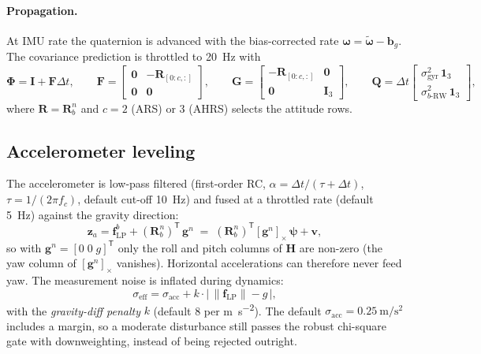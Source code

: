 \documentclass[11pt,a4paper]{article}
\newcommand{\vect}[1]{\bm{#1}}
\newcommand{\mat}[1]{\bm{#1}}
\newcommand{\T}{^{\mathsf{T}}}
\newcommand{\cross}[1]{\left[#1\right]_{\times}}   %
\newcommand{\nframe}{n}
\newcommand{\bframe}{b}
\newcommand{\Rbn}{\mat{R}_{\bframe}^{\nframe}}
\newcommand{\dt}{\Delta t}
\begin{document}
\paragraph{Propagation.} At IMU rate the quaternion is advanced with the
bias-corrected rate $\vect{\omega} = \tilde{\vect{\omega}} -
\vect{b}_g$. The covariance prediction is throttled to \SI{20}{\hertz}
with \cite[eq.~10.9]{wendel2011}
\begin{equation}
  \mat{\Phi} = \mat{I} + \mat{F}\dt, \qquad
  \mat{F} =
  \begin{bmatrix}
    \mat{0} & -\mat{R}_{[0:c,:]} \\
    \mat{0} & \mat{0}
  \end{bmatrix},
  \qquad
  \mat{G} =
  \begin{bmatrix}
    -\mat{R}_{[0:c,:]} & \mat{0} \\
    \mat{0} & \mat{I}_3
  \end{bmatrix},
  \qquad
  \vect{Q} = \dt
  \begin{bmatrix}
    \sigma^2_{\text{gyr}}\,\vect{1}_3 \\
    \sigma^2_{b\text{-RW}}\,\vect{1}_3
  \end{bmatrix},
\end{equation}
where $\mat{R} = \Rbn$ and $c = 2$ (ARS) or $3$ (AHRS) selects the
attitude rows.

\subsection{Accelerometer leveling}

The accelerometer is low-pass filtered (first-order RC,
$\alpha = \dt/(\tau + \dt)$, $\tau = 1/(2\pi f_c)$, default cut-off
\SI{10}{\hertz}) and fused at a throttled rate (default \SI{5}{\hertz})
against the gravity direction:
\begin{equation}
  \vect{z}_a = \vect{f}^\bframe_{\text{LP}}
             + (\Rbn)\T\,\vect{g}^\nframe
  \;=\; (\Rbn)\T \cross{\vect{g}^\nframe}\,\vect{\psi} + \vect{v},
\end{equation}
so with $\vect{g}^\nframe = [0\;0\;g]\T$ only the roll and pitch
columns of $\mat{H}$ are non-zero (the yaw column of
$\cross{\vect{g}^\nframe}$ vanishes). Horizontal accelerations can
therefore never feed yaw. The measurement noise is inflated during dynamics:
\begin{equation}
  \sigma_{\text{eff}} = \sigma_{\text{acc}}
    + k \cdot \big|\, \|\vect{f}_{\text{LP}}\| - g \,\big| ,
\end{equation}
with the \emph{gravity-diff penalty} $k$ (default 8 per
\si{\metre\per\second\squared}). The default $\sigma_{\text{acc}} =
\SI{0.25}{\metre\per\second\squared}$ includes a margin, so a
moderate disturbance still passes the robust chi-square gate with
downweighting, instead of being rejected outright.
\end{document}
